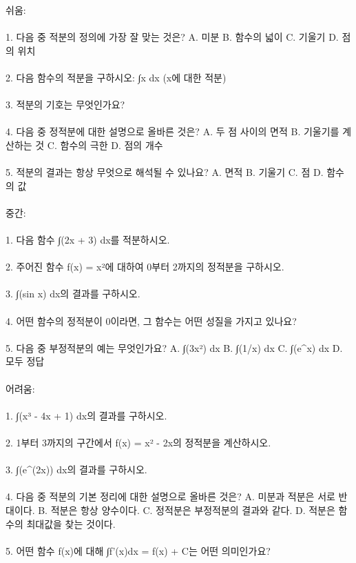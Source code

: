 \documentclass[fleqn]{article}
\begin{document}
      
        쉬움: \\\\
1. 다음 중 적분의 정의에 가장 잘 맞는 것은?  
   A. 미분  
   B. 함수의 넓이  
   C. 기울기  
   D. 점의 위치 \\\\
   
2. 다음 함수의 적분을 구하시오: ∫x dx (x에 대한 적분) \\\\
   
3. 적분의 기호는 무엇인가요? \\\\
   
4. 다음 중 정적분에 대한 설명으로 올바른 것은?  
   A. 두 점 사이의 면적  
   B. 기울기를 계산하는 것  
   C. 함수의 극한  
   D. 점의 개수 \\\\
   
5. 적분의 결과는 항상 무엇으로 해석될 수 있나요?  
   A. 면적  
   B. 기울기  
   C. 점  
   D. 함수의 값 \\\\

중간: \\\\
1. 다음 함수 ∫(2x + 3) dx를 적분하시오. \\\\
   
2. 주어진 함수 f(x) = x²에 대하여 0부터 2까지의 정적분을 구하시오. \\\\
   
3. ∫(sin x) dx의 결과를 구하시오. \\\\
   
4. 어떤 함수의 정적분이 0이라면, 그 함수는 어떤 성질을 가지고 있나요? \\\\
   
5. 다음 중 부정적분의 예는 무엇인가요?  
   A. ∫(3x²) dx  
   B. ∫(1/x) dx  
   C. ∫(e^x) dx  
   D. 모두 정답 \\\\

어려움: \\\\
1. ∫(x³ - 4x + 1) dx의 결과를 구하시오. \\\\
   
2. 1부터 3까지의 구간에서 f(x) = x² - 2x의 정적분을 계산하시오. \\\\
   
3. ∫(e^(2x)) dx의 결과를 구하시오. \\\\
   
4. 다음 중 적분의 기본 정리에 대한 설명으로 올바른 것은?  
   A. 미분과 적분은 서로 반대이다.  
   B. 적분은 항상 양수이다.  
   C. 정적분은 부정적분의 결과와 같다.  
   D. 적분은 함수의 최대값을 찾는 것이다. \\\\
   
5. 어떤 함수 f(x)에 대해 ∫f'(x)dx = f(x) + C는 어떤 의미인가요? \\\\

      
        
\end{document}
